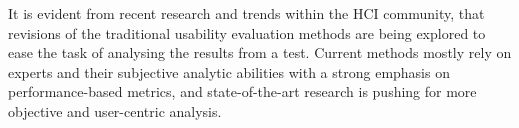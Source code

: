 It is evident from recent research and trends within the HCI community, that revisions of the traditional usability
evaluation methods are being explored to ease the task of analysing the results from a test.
Current methods mostly rely on experts and their subjective analytic abilities with a strong emphasis on performance-based
metrics, and state-of-the-art research is pushing for more objective and user-centric analysis.
